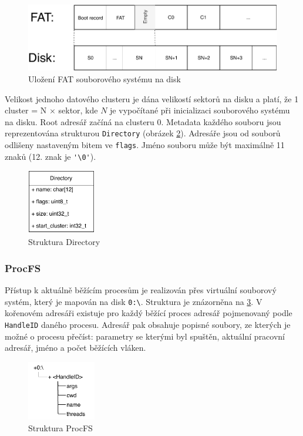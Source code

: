 \documentclass[11pt,a4paper]{scrartcl}
\begin{document}
	\begin{figure}[H]
		\centering
		\includegraphics[width=12cm]{fat-rozdeleni-disku.pdf}
		\caption{Uložení FAT souborového systému na disk}
		\label{fig:fat-disk-struct}
	\end{figure}

	Velikost jednoho datového clusteru je dána velikostí sektorů na disku a platí, že 1 cluster = N $\times$ sektor, kde $N$ je vypočítané při inicializaci souborového systému na disku. Root adresář začíná na clusteru 0. Metadata každého souboru jsou reprezentována strukturou \verb|Directory| (obrázek \ref{fig:dir-c}). Adresáře jsou od souborů odlišeny nastaveným bitem ve \verb|flags|. Jméno souboru může být maximálně 11 znaků (12. znak je \verb|'\0'|).
	
	\begin{figure}[H]
		\centering
		\includegraphics[width=3cm]{dir-c.pdf}
		\caption{Struktura Directory}
		\label{fig:dir-c}
	\end{figure}


	\subsubsection{ProcFS}
	\label{sec:proc-fs}
	Přístup k aktuálně běžícím procesům je realizován přes virtuální souborový systém, který je mapován na disk \verb|0:\|. Struktura je znázorněna na \ref{fig:procfs-struct}. V kořenovém adresáři existuje pro každý běžící proces adresář pojmenovaný podle \verb|HandleID| daného procesu. Adresář pak obsahuje popisné soubory, ze kterých je možné o procesu přečíst: parametry se kterými byl spuštěn, aktuální pracovní adresář, jméno a počet běžících vláken.
	
	\begin{figure}[H]
		\centering
		\includegraphics[width=3cm]{procfs-struct.pdf}
		\caption{Struktura ProcFS}
		\label{fig:procfs-struct}
	\end{figure}
	
\end{document}
